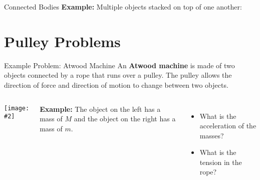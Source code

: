 \documentclass[12pt,compress,aspectratio=169]{beamer}
\newcommand{\pic}[2]{\texttt{[image: \#2]}}
\newcommand{\mb}[1]{\ensuremath\mathbf{#1}}
\begin{document}
\begin{frame}{Connected Bodies}
  \textbf{Example:} Multiple objects stacked on top of one another:
  \begin{center}
  \end{center}
\end{frame}


\section{Pulley Problems}

\begin{frame}{Example Problem: Atwood Machine}
  An \textbf{Atwood machine} is made of two objects connected by a rope that
  runs over a pulley. The pulley allows the direction of force and direction
  of motion to change between two objects.
  \begin{columns}
    \begin{center}
      \pic{1}{graphics/pulley_prob_2}
    \end{center}
    \textbf{Example:} The object on the left has a mass of $M$ and the object
    on the right has a mass of $m$.
    \begin{itemize}
    \item What is the acceleration of the masses?
    \item What is the tension in the rope?
    \end{itemize}
  \end{columns}
\end{frame}
\end{document}
